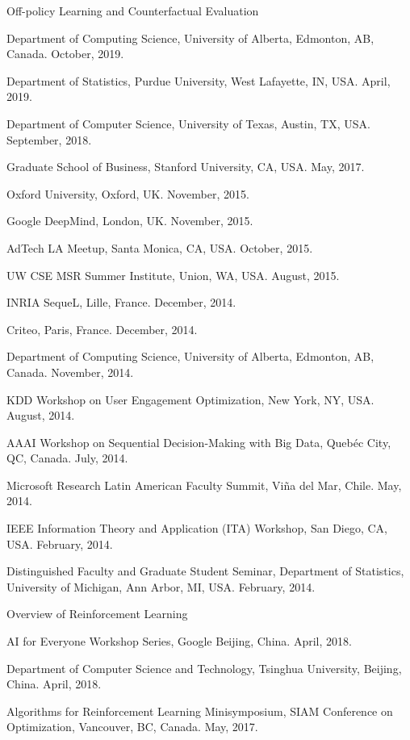 \documentclass[10pt,twoside,letterpaper]{article}
\begin{document}
\begin{compactitem}
\item{Off-policy Learning and Counterfactual Evaluation}
\begin{compactitem}
\item{Department of Computing Science, University of Alberta, Edmonton, AB, Canada.  October, 2019.}
\item{Department of Statistics, Purdue University, West Lafayette, IN, USA.  April, 2019.}
\item{Department of Computer Science, University of Texas, Austin, TX, USA.  September, 2018.}
\item{Graduate School of Business, Stanford University, CA, USA.  May, 2017.}
\item{Oxford University, Oxford, UK. November, 2015.}
\item{Google DeepMind, London, UK. November, 2015.}
\item{AdTech LA Meetup, Santa Monica, CA, USA. October, 2015.}
\item{UW CSE MSR Summer Institute, Union, WA, USA. August, 2015.}
\item{INRIA SequeL, Lille, France. December, 2014.}
\item{Criteo, Paris, France. December, 2014.}
\item{Department of Computing Science, University of Alberta, Edmonton, AB, Canada.  November, 2014.}
\item{KDD Workshop on User Engagement Optimization, New York, NY, USA.  August, 2014.}
\item{AAAI Workshop on Sequential Decision-Making with Big Data, Queb{\'e}c City, QC, Canada. July, 2014.}
\item{Microsoft Research Latin American Faculty Summit, Vi\~na del Mar, Chile. May, 2014.}
\item{IEEE Information Theory and Application (ITA) Workshop, San Diego, CA, USA.  February, 2014.}
\item{Distinguished Faculty and Graduate Student Seminar, Department of Statistics, University of Michigan, Ann Arbor, MI, USA.  February, 2014.}
\end{compactitem}

\item{Overview of Reinforcement Learning}
\begin{compactitem}
\item{AI for Everyone Workshop Series, Google Beijing, China.  April, 2018.}
\item{Department of Computer Science and Technology, Tsinghua University, Beijing, China.  April, 2018.}
\item{Algorithms for Reinforcement Learning Minisymposium, SIAM Conference on Optimization, Vancouver, BC, Canada.  May, 2017.}
\end{compactitem}


\end{compactitem}
\end{document}
